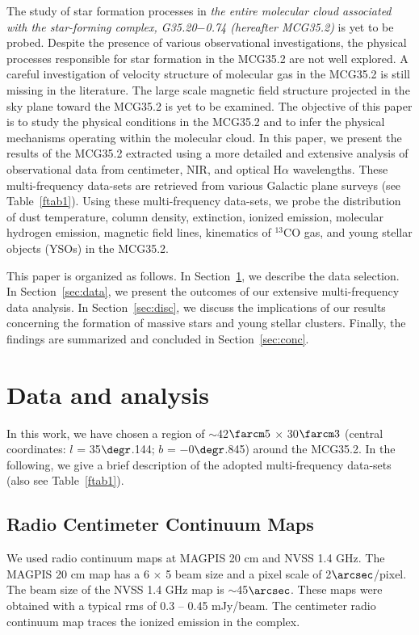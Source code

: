 \documentclass[iop]{emulateapj}
\begin{document}
The study of star formation processes in {\it the entire molecular cloud associated with the star-forming complex, G35.20$-$0.74 
(hereafter MCG35.2)} is yet to be probed. 
Despite the presence of various observational investigations, 
the physical processes responsible for star formation in the MCG35.2 are not well explored.
A careful investigation of velocity structure of molecular gas in the MCG35.2 is still missing in the literature. 
The large scale magnetic field structure projected in the sky plane toward the MCG35.2 is yet to be examined. 
The objective of this paper is to study the physical conditions in the MCG35.2 and to infer the physical mechanisms operating within the molecular cloud.
In this paper, we present the results of the MCG35.2 extracted using a more detailed and extensive analysis of observational 
data from centimeter, NIR, and optical H$\alpha$ wavelengths. 
These multi-frequency data-sets are retrieved from various Galactic plane surveys (see Table~\ref{ftab1}). 
Using these multi-frequency data-sets, we probe the distribution of dust temperature, column density, extinction, ionized emission, 
molecular hydrogen emission, magnetic field lines, kinematics of $^{13}$CO gas, 
and young stellar objects (YSOs) in the MCG35.2.  

This paper is organized as follows. In Section~\ref{sec:obser}, we describe the data selection. 
In Section~\ref{sec:data}, we present the outcomes of our extensive multi-frequency data analysis. 
In Section~\ref{sec:disc}, we discuss the implications of our results concerning the formation of massive stars and young stellar clusters. 
Finally, the findings are summarized and concluded in Section~\ref{sec:conc}.
%
\section{Data and analysis}
\label{sec:obser}
%
In this work, we have chosen a region of $\sim$42$\farcm5$ $\times$ 30$\farcm3$ 
(central coordinates: $l$ = 35$\degr$.144; $b$ = $-$0$\degr$.845) around the MCG35.2.
In the following, we give a brief description of the adopted multi-frequency data-sets (also see Table~\ref{ftab1}). 
%
\subsection{Radio Centimeter Continuum Maps}
We used radio continuum maps at MAGPIS 20 cm and NVSS 1.4 GHz.
The MAGPIS 20 cm map has a 6 $\times$ 5 beam size and a pixel scale of 2$\arcsec$/pixel. 
The beam size of the NVSS 1.4 GHz map is $\sim$45$\arcsec$. 
These maps were obtained with a typical rms of 0.3 -- 0.45 mJy/beam. 
The centimeter radio continuum map traces the ionized emission in the complex.
%
\end{document}
